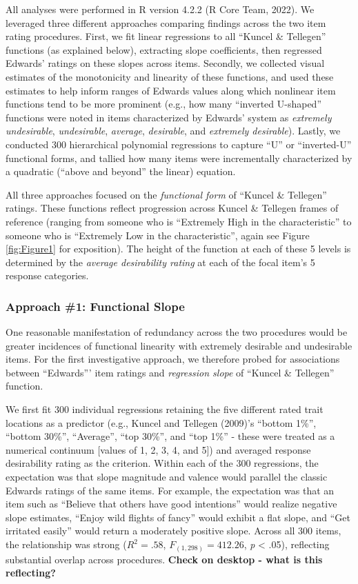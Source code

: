 \documentclass[
  ,jou]{apa6}
\begin{document}
All analyses were performed in R version 4.2.2 (R Core Team, 2022). We leveraged three different approaches comparing findings across the two item rating procedures. First, we fit linear regressions to all ``Kuncel \& Tellegen'' functions (as explained below), extracting slope coefficients, then regressed Edwards' ratings on these slopes across items. Secondly, we collected visual estimates of the monotonicity and linearity of these functions, and used these estimates to help inform ranges of Edwards values along which nonlinear item functions tend to be more prominent (e.g., how many ``inverted U-shaped'' functions were noted in items characterized by Edwards' system as \emph{extremely undesirable}, \emph{undesirable}, \emph{average}, \emph{desirable}, and \emph{extremely desirable}). Lastly, we conducted 300 hierarchical polynomial regressions to capture ``U'' or ``inverted-U'' functional forms, and tallied how many items were incrementally characterized by a quadratic (``above and beyond'' the linear) equation.

All three approaches focused on the \emph{functional form} of ``Kuncel \& Tellegen'' ratings. These functions reflect progression across Kuncel \& Tellegen frames of reference (ranging from someone who is ``Extremely High in the characteristic'' to someone who is ``Extremely Low in the characteristic'', again see Figure \ref{fig:Figure1} for exposition). The height of the function at each of these 5 levels is determined by the \emph{average desirability rating} at each of the focal item's 5 response categories.

\hypertarget{approach-1-functional-slope}{%
\subsubsection{Approach \#1: Functional Slope}\label{approach-1-functional-slope}}

One reasonable manifestation of redundancy across the two procedures would be greater incidences of functional linearity with extremely desirable and undesirable items. For the first investigative approach, we therefore probed for associations between ``Edwards''' item ratings and \emph{regression slope} of ``Kuncel \& Tellegen'' function.

We first fit 300 individual regressions retaining the five different rated trait locations as a predictor (e.g., Kuncel and Tellegen (2009)'s ``bottom 1\%'', ``bottom 30\%'', ``Average'', ``top 30\%'', and ``top 1\%'' - these were treated as a numerical continuum {[}values of 1, 2, 3, 4, and 5{]}) and averaged response desirability rating as the criterion. Within each of the 300 regressions, the expectation was that slope magnitude and valence would parallel the classic Edwards ratings of the same items. For example, the expectation was that an item such as ``Believe that others have good intentions'' would realize negative slope estimates, ``Enjoy wild flights of fancy'' would exhibit a flat slope, and ``Get irritated easily'' would return a moderately positive slope. Across all 300 items, the relationship was strong (\(R^2 = .58\), \(F_{(1,298)} = 412.26\), \emph{p} \textless{} .05), reflecting substantial overlap across procedures. \textbf{Check on desktop - what is this reflecting?}
\end{document}
